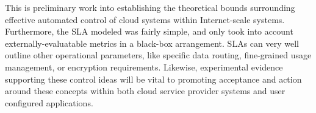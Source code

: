 \documentclass[a4paper,twoside]{article}
\begin{document}
This is preliminary work into establishing the theoretical bounds surrounding effective automated control of cloud systems within Internet-scale systems.  Furthermore, the SLA modeled was fairly simple, and only took into account externally-evaluatable metrics in a black-box arrangement.  SLAs can very well outline other operational parameters, like specific data routing, fine-grained usage management, or encryption requirements.  Likewise, experimental evidence supporting these control ideas will be vital to promoting acceptance and action around these concepts within both cloud service provider systems and user configured applications.


{\small
}
\end{document}

